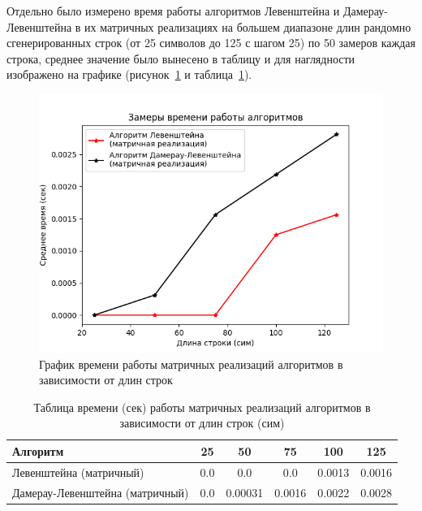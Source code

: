 \hspace{1.25cm}
Отдельно было измерено время работы алгоритмов Левенштейна и Дамерау-Левенштейна в их матричных реализациях на большем диапазоне длин рандомно сгенерированных строк (от 25 символов до 125 с шагом 25) по 50 замеров каждая строка, среднее значение было вынесено в таблицу и для наглядности изображено на графике (рисунок~\ref{fig:graph_mat} и таблица~\ref{table:table_mat}).

\begin{figure}[H]
    \centering
    \includegraphics[width=1\textwidth]{img/graph_mat.png}
    \caption{График времени работы матричных реализаций алгоритмов в зависимости от длин строк}
    \label{fig:graph_mat}
\end{figure}

\begin{table}[H]
    \centering
    \begin{tabular}{|l|c|c|c|c|c|}
        \hline
        \textbf{Алгоритм} & \textbf{25} & \textbf{50} & \textbf{75} & \textbf{100} & \textbf{125}\\
        \hline
        Левенштейна (матричный) & 0.0 & 0.0 & 0.0 & 0.0013 & 0.0016 \\
        Дамерау-Левенштейна (матричный) & 0.0 & 0.00031 & 0.0016  & 0.0022 & 0.0028 \\
        \hline
    \end{tabular}
    \caption{Таблица времени (сек) работы матричных реализаций алгоритмов в зависимости от длин строк (сим)}
    \label{table:table_mat}
\end{table}

